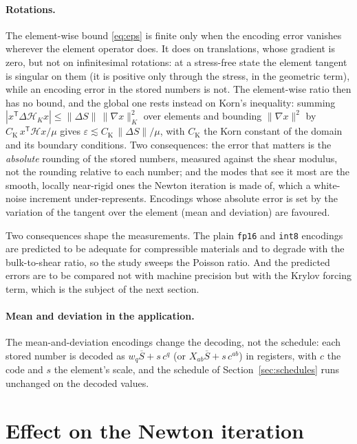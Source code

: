 \documentclass[sigconf,balance=false]{acmart}
\newcommand{\Sbar}{\overline{S}}
\newcommand{\eps}{\varepsilon}
\begin{document}
\paragraph{Rotations.}  The element-wise bound \eqref{eq:eps} is finite only when the encoding
error vanishes wherever the element operator does.  It does on translations, whose gradient is
zero, but not on infinitesimal rotations: at a stress-free state the element tangent is singular on
them (it is positive only through the stress, in the geometric term), while an encoding error in
the stored numbers is not.  The element-wise ratio then has no bound, and the global one rests
instead on Korn's inequality: summing $|x^{\mathsf T}\Delta\mathcal{H}_K x| \le \|\Delta S\|\,
\|\nabla x\|^2_K$ over elements and bounding $\|\nabla x\|^2$ by $C_{\mathrm{K}}\,x^{\mathsf T}
\mathcal{H}x/\mu$ gives $\eps \lesssim C_{\mathrm{K}}\,\|\Delta S\|/\mu$, with $C_{\mathrm{K}}$ the
Korn constant of the domain and its boundary conditions.  Two consequences: the error that matters
is the \emph{absolute} rounding of the stored numbers, measured against the shear modulus, not
the rounding relative to each number; and the modes that see it most are the smooth, locally
near-rigid ones the Newton iteration is made of, which a white-noise increment under-represents.
Encodings whose absolute error is set by the variation of the tangent over the element (mean and
deviation) are favoured.

Two consequences shape the measurements.  The plain \texttt{fp16} and \texttt{int8} encodings are
predicted to be adequate for compressible materials and to degrade with the bulk-to-shear ratio,
so the study sweeps the Poisson ratio.  And the predicted errors are to be compared not with
machine precision but with the Krylov forcing term, which is the subject of the next section.

\paragraph{Mean and deviation in the application.}\label{sec:meandev}  The mean-and-deviation encodings change the decoding, not the schedule: each stored number is
decoded as $w_q\Sbar + s\,c^q$ (or $X_{ab}\Sbar + s\,c^{ab}$) in registers, with $c$ the code and $s$
the element's scale, and the schedule of Section~\ref{sec:schedules} runs unchanged on the decoded
values.

\section{Effect on the Newton iteration}
\label{sec:newton}
\end{document}

